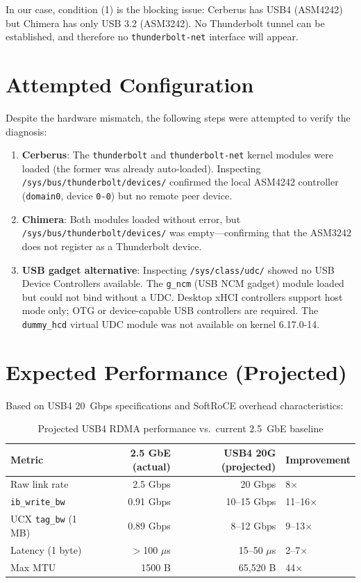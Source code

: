 \documentclass[11pt,letterpaper]{article}
\begin{document}
In our case, condition (1) is the blocking issue: Cerberus has USB4 (ASM4242) but Chimera has only USB 3.2 (ASM3242). No Thunderbolt tunnel can be established, and therefore no \texttt{thunderbolt-net} interface will appear.

\section{Attempted Configuration}

Despite the hardware mismatch, the following steps were attempted to verify the diagnosis:

\begin{enumerate}
    \item \textbf{Cerberus}: The \texttt{thunderbolt} and \texttt{thunderbolt-net} kernel modules were loaded (the former was already auto-loaded). Inspecting \texttt{/sys/bus/thunderbolt/devices/} confirmed the local ASM4242 controller (\texttt{domain0}, device \texttt{0-0}) but no remote peer device.

    \item \textbf{Chimera}: Both modules loaded without error, but \texttt{/sys/bus/thunderbolt/devices/} was empty---confirming that the ASM3242 does not register as a Thunderbolt device.

    \item \textbf{USB gadget alternative}: Inspecting \texttt{/sys/class/udc/} showed no USB Device Controllers available. The \texttt{g\_ncm} (USB NCM gadget) module loaded but could not bind without a UDC. Desktop xHCI controllers support host mode only; OTG or device-capable USB controllers are required. The \texttt{dummy\_hcd} virtual UDC module was not available on kernel 6.17.0-14.
\end{enumerate}

\section{Expected Performance (Projected)}

Based on USB4 20~Gbps specifications and SoftRoCE overhead characteristics:

\begin{table}[htbp]
\centering
\caption{Projected USB4 RDMA performance vs.\ current 2.5~GbE baseline}
\label{tab:usb4-projected}
\begin{tabular}{@{}lrrl@{}}
\toprule
\textbf{Metric} & \textbf{2.5 GbE (actual)} & \textbf{USB4 20G (projected)} & \textbf{Improvement} \\
\midrule
Raw link rate & 2.5 Gbps & 20 Gbps & 8$\times$ \\
\texttt{ib\_write\_bw} & 0.91 Gbps & 10--15 Gbps & 11--16$\times$ \\
UCX \texttt{tag\_bw} (1 MB) & 0.89 Gbps & 8--12 Gbps & 9--13$\times$ \\
Latency (1 byte) & $>$100 $\mu$s & 15--50 $\mu$s & 2--7$\times$ \\
Max MTU & 1500 B & 65,520 B & 44$\times$ \\
\bottomrule
\end{tabular}
\end{table}
\end{document}

